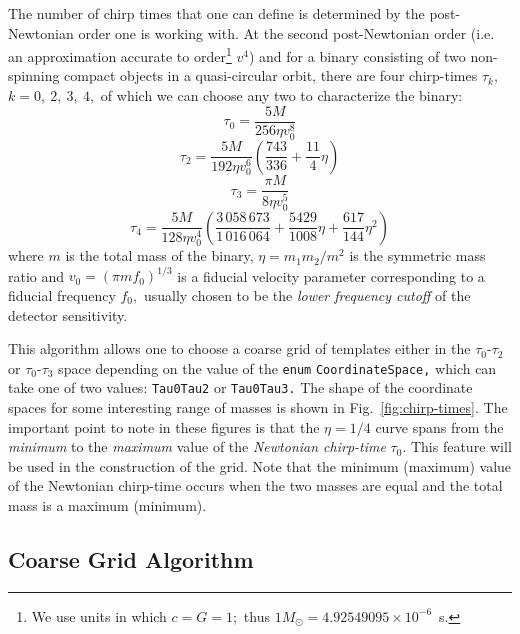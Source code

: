 The number of chirp
times that one can define is determined by the post-Newtonian order
one is working with. At the second post-Newtonian order (i.e. 
an approximation accurate to order\footnote{We use units in 
which $c=G=1;$ thus $1M_\odot=4.92549095 \times 10^{-6}$~s.} $v^4$) and for
a binary consisting of two non-spinning compact objects in a quasi-circular
orbit, there are
four chirp-times $\tau_k,$ $k=0,\ 2,\ 3,\ 4,$ of which we can choose
any two to characterize the binary:
\begin{equation}
\tau_{0} = \frac{5M}{256 \eta v_{0}^{8}}
\end{equation}
\begin{equation}
\tau_{2} = \frac{5M}{192 \eta v_{0}^{6}} \left( \frac{743}{336} + \frac{11}{4} \eta \right)
\end{equation}
\begin{equation}
\tau_{3} = \frac{\pi M}{8 \eta v_{0}^{5}}
\end{equation}
\begin{equation}
\tau_{4} = \frac{5M}{128 \eta v_{0}^4} \left( \frac{3\,058\,673}{1\,016\,064} + \frac{5429}{1008}
\eta +
\frac{617}{144} \eta^{2} \right)
\end{equation}
where $m$ is the total mass of the
binary, $\eta=m_1m_2/m^2$ is the symmetric mass ratio and   
$v_0 = (\pi m f_0)^{1/3}$ is a fiducial velocity parameter corresponding
to a fiducial frequency $f_0,$ usually chosen to be the {\it lower 
frequency cutoff} of the detector sensitivity. 

This algorithm allows one to choose
a coarse grid of templates either in the $\tau_0$-$\tau_2$
or $\tau_0$-$\tau_3$ space depending on the value of the
\texttt {enum} 
\texttt {CoordinateSpace,} which can take one of two values:
\texttt {Tau0Tau2} or \texttt {Tau0Tau3.} The shape of the coordinate
spaces for some interesting range of masses is shown 
in Fig.~\ref{fig:chirp-times}. The important point to note in these
figures is that the $\eta=1/4$ curve spans from the {\it minimum} to the
{\it maximum} value of the {\it Newtonian chirp-time} $\tau_0.$  This
feature will be used in the construction of the grid. Note that
the minimum (maximum) value of the Newtonian chirp-time occurs when 
the two masses are equal and the total mass is a maximum (minimum).

\subsection{Coarse Grid Algorithm}

